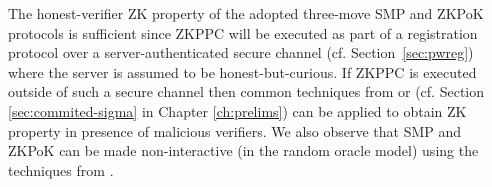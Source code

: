 \begin{remark}
The honest-verifier \ac{ZK} property of the adopted three-move \ac{SMP} and \ac{ZKPoK} protocols is sufficient since \ac{ZKPPC} will be executed as part of a registration protocol over a server-authenticated secure channel (cf. Section~\ref{sec:pwreg}) where the server is assumed to be honest-but-curious. 
If \ac{ZKPPC} is executed outside of such a secure channel then common techniques from \citet{CramerDM00} or \citet{Damgard00} (cf. Section \ref{sec:commited-sigma} in Chapter \ref{ch:prelims}) can be applied to obtain \ac{ZK} property in presence of malicious verifiers. 
We also observe that \ac{SMP} and \ac{ZKPoK} can be made non-interactive (in the random oracle model) using the techniques from \citet{FiatS86}.
\end{remark}


